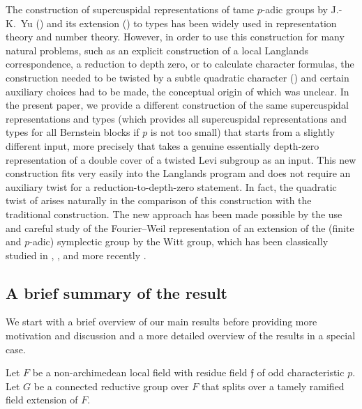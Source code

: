 \documentclass{article}
\theoremstyle{definition}
\numberwithin{equation}{subsection}
\renewcommand{\-}{\hyp{}}
\newcommand{\rf}{\mathfrak{f}}
\begin{document}
The construction of supercuspidal representations of tame $p$-adic groups by J.-K.\ Yu (\cite{Yu01}) and its extension (\cite{KimYu}) to types has been widely used in representation theory and number theory. However, in order to use this construction for many natural problems, such as an explicit construction of a local Langlands correspondence, a reduction to depth zero, or to calculate character formulas, the construction needed to be twisted by a subtle quadratic character (\cite{FKS23}) and certain auxiliary choices had to be made, the conceptual origin of which was unclear. In the present paper, we provide a different construction of the same supercuspidal representations and types (which provides all supercuspidal representations and types for all Bernstein blocks if $p$ is not too small) that starts from a slightly different input, more precisely that takes a genuine essentially depth-zero representation of a double cover of a twisted Levi subgroup as an input. 
This new construction fits very easily into the Langlands program and does not require an auxiliary twist for a reduction-to-depth-zero statement. In fact, the quadratic twist of \cite{FKS23} arises naturally in the comparison of this construction with the traditional construction. The new approach has been made possible by the use and careful study of the Fourier--Weil representation of an extension of the (finite and $p$-adic) symplectic group by the Witt group, which has been classically studied in \cite{LionVergne}, \cite{RR93}, and more recently \cite{Thomas2013}.


\subsection{A brief summary of the result}\label{sub:introoverview}
We start with a brief overview of our main results before providing more motivation and discussion and a more detailed overview of the results in a special case. 

Let $F$ be a non-archimedean local field with residue field $\rf$ of odd characteristic $p$.
Let $G$ be a connected reductive group over $F$ that splits over a tamely ramified field extension of $F$.
\end{document}
